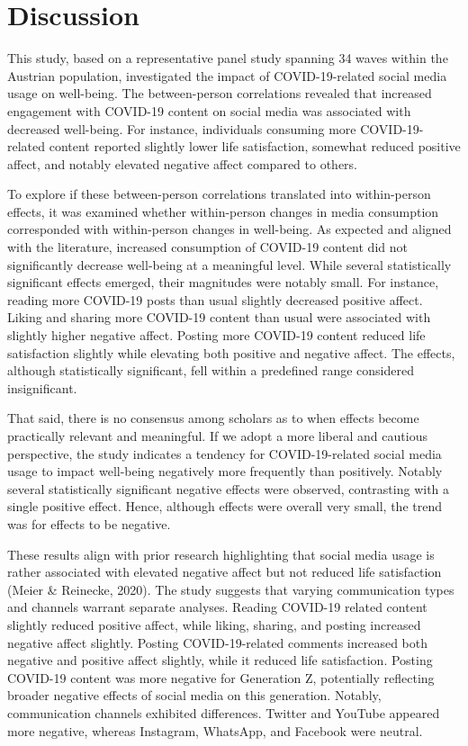 \documentclass[
  man,mask,floatsintext]{apa7}
\begin{document}
\section{Discussion}\label{discussion}

This study, based on a representative panel study spanning 34 waves within the Austrian population, investigated the impact of COVID-19-related social media usage on well-being.
The between-person correlations revealed that increased engagement with COVID-19 content on social media was associated with decreased well-being.
For instance, individuals consuming more COVID-19-related content reported slightly lower life satisfaction, somewhat reduced positive affect, and notably elevated negative affect compared to others.

To explore if these between-person correlations translated into within-person effects, it was examined whether within-person changes in media consumption corresponded with within-person changes in well-being.
As expected and aligned with the literature, increased consumption of COVID-19 content did not significantly decrease well-being at a meaningful level.
While several statistically significant effects emerged, their magnitudes were notably small.
For instance, reading more COVID-19 posts than usual slightly decreased positive affect.
Liking and sharing more COVID-19 content than usual were associated with slightly higher negative affect.
Posting more COVID-19 content reduced life satisfaction slightly while elevating both positive and negative affect.
The effects, although statistically significant, fell within a predefined range considered insignificant.

That said, there is no consensus among scholars as to when effects become practically relevant and meaningful.
If we adopt a more liberal and cautious perspective, the study indicates a tendency for COVID-19-related social media usage to impact well-being negatively more frequently than positively.
Notably several statistically significant negative effects were observed, contrasting with a single positive effect.
Hence, although effects were overall very small, the trend was for effects to be negative.

These results align with prior research highlighting that social media usage is rather associated with elevated negative affect but not reduced life satisfaction (Meier \& Reinecke, 2020).
The study suggests that varying communication types and channels warrant separate analyses.
Reading COVID-19 related content slightly reduced positive affect, while liking, sharing, and posting increased negative affect slightly.
Posting COVID-19-related comments increased both negative and positive affect slightly, while it reduced life satisfaction.
Posting COVID-19 content was more negative for Generation Z, potentially reflecting broader negative effects of social media on this generation.
Notably, communication channels exhibited differences.
Twitter and YouTube appeared more negative, whereas Instagram, WhatsApp, and Facebook were neutral.
\end{document}
